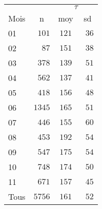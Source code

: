 \begin{tabular}{lccc}
\toprule
 &  & \multicolumn{2}{c}{$\tau$} \\ \cmidrule(lr){3-4}
Mois  & n & moy & \multicolumn{1}{c}{sd} \\ 
\midrule
01  & $\phantom{0}101$ & $121$ & $\phantom{0}36$ \\
02  & $\phantom{00}87$ & $151$ & $\phantom{0}38$ \\
03  & $\phantom{0}378$ & $139$ & $\phantom{0}51$ \\
04  & $\phantom{0}562$ & $137$ & $\phantom{0}41$ \\
05  & $\phantom{0}418$ & $156$ & $\phantom{0}48$ \\
06  & $1345$ & $165$ & $\phantom{0}51$ \\
07  & $\phantom{0}446$ & $155$ & $\phantom{0}60$ \\
08  & $\phantom{0}453$ & $192$ & $\phantom{0}54$ \\
09  & $\phantom{0}547$ & $175$ & $\phantom{0}54$ \\
10  & $\phantom{0}748$ & $174$ & $\phantom{0}50$ \\
11  & $\phantom{0}671$ & $157$ & $\phantom{0}45$ \\
Tous  & $5756$ & $161$ & $\phantom{0}52$ \\
\bottomrule 
\end{tabular}
